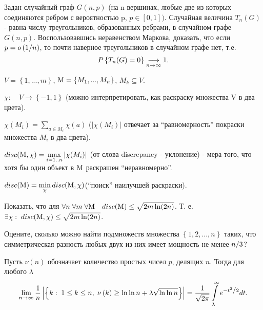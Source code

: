\begin{problem}
Задан случайный граф $G(n,p)$ (на n вершинах, любые две из которых 
соединяются ребром с вероятностью p, $p\in [0,1])$. Случайная величина $T_n 
(G)$ - равна числу треугольников, образованных ребрами, в случайном графе 
$G(n,p)$. Воспользовавшись неравенством Маркова, доказать, что если 
$p=o\left( {1 \mathord{\left/ {\vphantom {1 n}} \right. 
\kern-\nulldelimiterspace} n} \right)$, то почти наверное треугольников в 
случайном графе нет, т.е.
\[
P\left\{ {T_n (G)=0} 
\right\}\mathrel{\mathop{\kern0pt\longrightarrow}\limits_{n\to \infty }} 1.
\]
\end{problem}


\begin{problem}
$V=\left\{ {1,...,m} \right\}$, ${\rm M}=\left\{ {M_1 
,...,M_n } \right\}$, $M_k \subseteq V$.

$\chi :\quad V\to \left\{ {-1,1} \right\}$ (можно интерпретировать, как 
раскраску множества V в два цвета).

$\chi (M_i )=\sum\limits_{a\in M_i } {\chi (a)} $ ($\left| {\chi (M_i )} 
\right|$ отвечает за ``равномерность'' покраски множества $M_i $ в два 
цвета).

$disc({\rm M},\chi )=\mathop {\max }\limits_{i=1..n} \left| {\chi (M_i )} 
\right|$ (от слова discrepancy - уклонение) - мера того, что хотя бы один 
объект в ${\rm M}$ раскрашен ``неравномерно''.

$disc({\rm M})=\mathop {\min }\limits_\chi disc({\rm M},\chi )$(``поиск'' 
наилучшей раскраски).

Показать, что для $\forall n\;\forall m\;\forall {\rm M} \quad disc({\rm M})\le 
\sqrt {2m\ln (2n)} $. Т. е. $\exists \chi :\;disc({\rm M},\chi )\le \sqrt 
{2m\ln (2n)} $.

\end{problem}


\begin{problem}
Оцените, сколько можно найти подмножеств множества 
$\left\{ {1,2,...,n} \right\}$ таких, что симметрическая разность любых двух 
из них имеет мощность не менее $n \mathord{\left/ {\vphantom {n 3}} \right. 
\kern-\nulldelimiterspace} 3$?
\end{problem}



\begin{problem}
Пусть $\nu \left( n \right)$ 
обозначает количество простых чисел $p$, делящих $n$. Тогда для любого 
$\lambda $
\[
\mathop {\lim }\limits_{n\to \infty } \frac{1}{n}\left| {\left\{ {k:\;1\le 
k\le n,\;\nu \left( k \right)\ge \ln \ln n+\lambda \sqrt {\ln \ln n} } 
\right\}} \right|=\frac{1}{\sqrt {2\pi } }\int\limits_\lambda ^\infty 
{e^{-{t^2} \mathord{\left/ {\vphantom {{t^2} 2}} \right. 
\kern-\nulldelimiterspace} 2}dt} .
\]
\end{problem}




